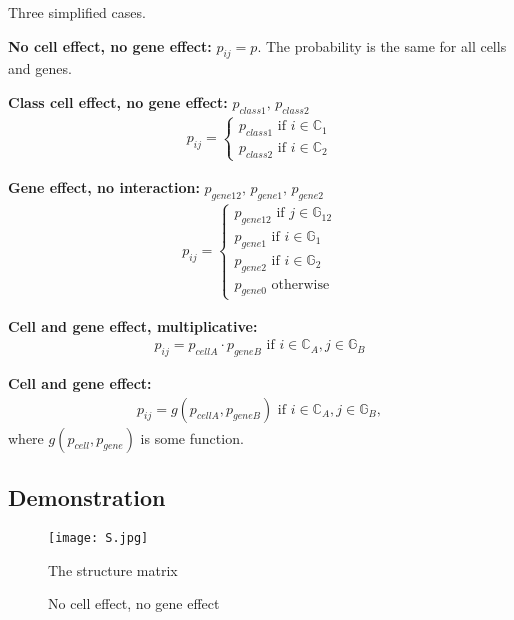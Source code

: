 \documentclass[12pt]{article}
\begin{document}
Three simplified cases. 

{\bf No cell effect, no gene effect:} $p_{ij} = p$.
The probability is the same for all cells and genes. 

{\bf Class cell effect, no gene effect:} $ p_{class 1},\,  p_{class 2}$
\begin{align}
  p_{ij} =
  \begin{cases}
    p_{class 1} \text{ if } i \in \mathbb{C}_{1} \\
    p_{class 2} \text{ if } i \in \mathbb{C}_{2}
  \end{cases}
\end{align}

{\bf Gene effect, no interaction:} $ p_{gene 12}, \, p_{gene 1}, \, p_{gene 2}$
\begin{align}
  p_{ij} =
  \begin{cases}
    p_{gene 12} \text{ if } j \in \mathbb{G}_{12} \\
    p_{gene 1} \text{ if } i \in \mathbb{G}_{1} \\
    p_{gene 2} \text{ if } i \in \mathbb{G}_{2} \\
    p_{gene 0} \text{ otherwise} 
  \end{cases}
\end{align}

{\bf Cell and gene effect, multiplicative:} 
\begin{align}
  p_{ij} =  p_{cell A} \cdot p_{gene B} \text{ if } i  \in \mathbb{C}_{A}, j \in \mathbb{G}_{B}
\end{align}

{\bf Cell and gene effect:} 
\begin{align}
  p_{ij} =  g(p_{cell A}, p_{gene B}) \text{ if } i  \in \mathbb{C}_{A}, j \in \mathbb{G}_{B},
\end{align}
where $g(p_{cell},p_{gene})$ is some function. 


\subsection{Demonstration} \label{sec:Demo} %

\begin{figure}
  \texttt{[image: S.jpg]}
  \caption{The structure matrix}
\end{figure}

\begin{figure}
  \caption{No cell effect, no gene effect}
\end{figure}
\end{document}
